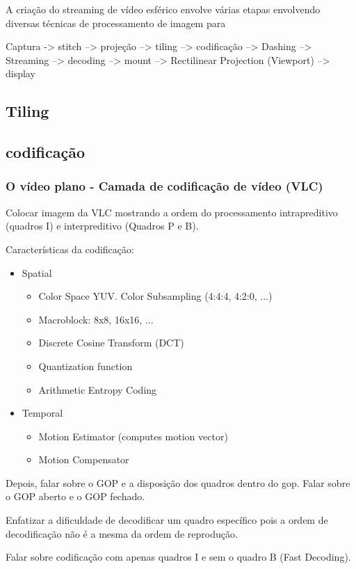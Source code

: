A criação do streaming de vídeo esférico envolve várias etapas envolvendo diversas técnicas de processamento de imagem para

Captura -> stitch --> projeção --> tiling --> codificação -->  Dashing --> Streaming --> decoding --> mount --> Rectilinear Projection (Viewport) --> display
\subsection{Tiling}
\subsection{codificação}
\subsubsection{O vídeo plano - Camada de codificação de vídeo (VLC)}

Colocar imagem da VLC mostrando a ordem do processamento intrapreditivo (quadros I) e interpreditivo (Quadros P e B).

Características da codificação:

\begin{itemize}
	\item Spatial
	\begin{itemize}
		\item Color Space YUV. Color Subsampling (4:4:4, 4:2:0, ...)
		\item Macroblock: 8x8, 16x16, ...
		\item Discrete Cosine Transform (DCT)
		\item Quantization function
		\item Arithmetic Entropy Coding
	\end{itemize}
	\item Temporal
	\begin{itemize}
		\item Motion Estimator (computes motion vector)
		\item Motion Compensator
	\end{itemize}
\end{itemize}

Depois, falar sobre o GOP e a disposição dos quadros dentro do gop. Falar sobre o GOP aberto e o GOP fechado.

Enfatizar a dificuldade de decodificar um quadro específico pois a ordem de decodificação não é a mesma da ordem de reprodução.

Falar sobre codificação com apenas quadros I e sem o quadro B (Fast Decoding).

